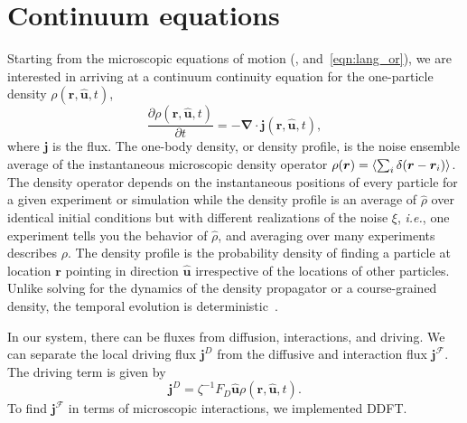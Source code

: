 \section{Continuum equations}
Starting from the microscopic equations of motion (,
and~\ref{eqn:lang_or}), we are interested in arriving at a continuum continuity
equation for the one-particle density $ \rho(\bm{r}, \hat{ \bm{u} },t) $,
%
\begin{equation}
  \label{eqn:continuity}
  \frac{\partial \rho( \bm{r}, \hat{\bm{u}}, t )}{\partial t} 
  = -\bm{\nabla} \cdot \bm{j} ( \bm{r}, \hat{\bm{u}}, t ),
\end{equation}
%
where $\bm{j}$ is the flux.  The one-body density, or density profile, is the
noise ensemble average of the instantaneous microscopic density operator
$\rho(\bm{r}) = \left\langle \sum_i \delta( \bm{r} - \bm{r}_i ) \right\rangle$. The density operator
depends on the instantaneous positions of every particle for a given experiment
or simulation while the density profile is an average of $\hat{\rho}$ over
identical initial conditions but with different realizations of the noise
$\xi$, \textit{i.e.}, one experiment tells you the behavior of $\hat{\rho}$,
and averaging over many experiments describes $\rho$.  The density profile is
the probability density of finding a particle at location $\bm{r}$ pointing in
direction $ \hat{ \bm{u} } $ irrespective of the locations of other particles.
Unlike solving for the dynamics of the density propagator or a course-grained
density, the temporal evolution is deterministic~\cite{archer_dynamical_04a}. 

In our system, there can be fluxes from diffusion, interactions, and driving. We
can separate the local driving flux $\bm{j}^{D}$ from the diffusive and
interaction flux $\bm{j}^{\mathcal{F}}$.  The driving term is given by
%
\begin{equation}
  \bm{j} ^ {D}  = \zeta^{-1} F_D \hat{\bm{u}} 
  \rho( \bm{r}, \hat{\bm{u}}, t).
\end{equation}
%
To find $\bm{j}^{\mathcal{F}}$ in terms of microscopic interactions, we
implemented DDFT\@.


